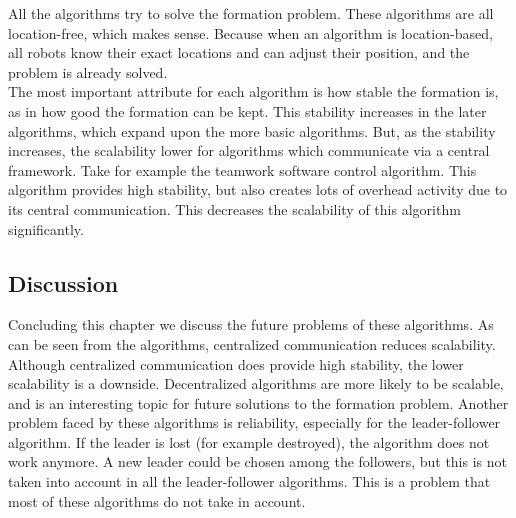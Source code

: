 All the algorithms try to solve the formation problem. 
These algorithms are all location-free, which makes sense.  
Because when an algorithm is location-based, all robots know their exact locations and can adjust their position, and the problem is already solved. \\
The most important attribute for each algorithm is how stable the formation is, as in how good the formation can be kept. 
This stability increases in the later algorithms, which expand upon the more basic algorithms. 
But, as the stability increases, the scalability lower for algorithms which communicate via a central framework. 
Take for example the teamwork software control algorithm. 
This algorithm provides high stability, but also creates lots of overhead activity due to its central communication.
This decreases the scalability of this algorithm significantly.\\

\subsection{Discussion}
Concluding this chapter we discuss the future problems of these algorithms. 
As can be seen from the algorithms, centralized communication reduces scalability. 
Although centralized communication does provide high stability, the lower scalability is a downside. 
Decentralized algorithms are more likely to be scalable, and is an interesting topic for future solutions to the formation problem.
Another problem faced by these algorithms is reliability, especially for the leader-follower algorithm. 
If the leader is lost (for example destroyed), the algorithm does not work anymore. 
A new leader could be chosen among the followers, but this is not taken into account in all the leader-follower algorithms. 
This is a problem that most of these algorithms do not take in account.  
  \begin{table}[H]
  \renewcommand{\arraystretch}{1.3}
  \label{table_alg_formation}
  \centering
{}
  \caption{Overview of Formation Algorithms}
  \end{table}